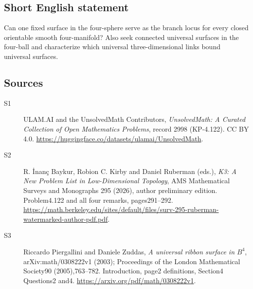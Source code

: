 \documentclass[11pt]{book}
\begin{document}
\subsection{Short English statement}
Can one fixed surface in the four-sphere serve as the branch locus for every closed orientable smooth four-manifold? Also seek connected universal surfaces in the four-ball and characterize which universal three-dimensional links bound universal surfaces.
\subsection{Sources}
\begin{description}
\item[\hypertarget{source:2998:1}{S1}] ULAM.AI and the UnsolvedMath Contributors, \emph{UnsolvedMath: A Curated Collection of Open Mathematics Problems}, record 2998 (KP-4.122). CC BY 4.0. \url{https://huggingface.co/datasets/ulamai/UnsolvedMath}.
\item[\hypertarget{source:2998:2}{S2}] R. İnanç Baykur, Robion C. Kirby and Daniel Ruberman (eds.), \emph{K3: A New Problem List in Low-Dimensional Topology}, AMS Mathematical Surveys and Monographs 295 (2026), author preliminary edition. Problem4.122 and all four remarks, pages291--292. \url{https://math.berkeley.edu/sites/default/files/surv-295-ruberman-watermarked-author-pdf.pdf}.
\item[\hypertarget{source:2998:3}{S3}] Riccardo Piergallini and Daniele Zuddas, \emph{A universal ribbon surface in $B^4$}, arXiv:math/0308222v1 (2003); Proceedings of the London Mathematical Society90 (2005),763--782. Introduction, page2 definitions, Section4 Questions2 and4. \url{https://arxiv.org/pdf/math/0308222v1}.
\end{description}
\label{end:2998}
\end{document}
